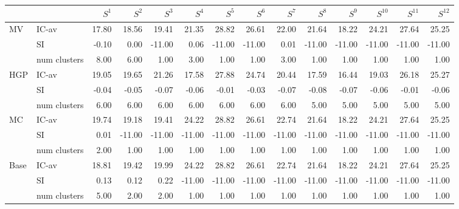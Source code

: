 \begin{tabular}{llrrrrrrrrrrrr}
\toprule
 &  & $S^{1}$ & $S^{2}$ & $S^{3}$ & $S^{4}$ & $S^{5}$ & $S^{6}$ & $S^{7}$ & $S^{8}$ & $S^{9}$ & $S^{10}$ & $S^{11}$ & $S^{12}$ \\
\midrule
\multirow[c]{3}{*}{MV} & IC-av & 17.80 & 18.56 & 19.41 & 21.35 & 28.82 & 26.61 & 22.00 & 21.64 & 18.22 & 24.21 & 27.64 & 25.25 \\
 & SI & -0.10 & 0.00 & -11.00 & 0.06 & -11.00 & -11.00 & 0.01 & -11.00 & -11.00 & -11.00 & -11.00 & -11.00 \\
 & num clusters & 8.00 & 6.00 & 1.00 & 3.00 & 1.00 & 1.00 & 3.00 & 1.00 & 1.00 & 1.00 & 1.00 & 1.00 \\
\multirow[c]{3}{*}{HGP} & IC-av & 19.05 & 19.65 & 21.26 & 17.58 & 27.88 & 24.74 & 20.44 & 17.59 & 16.44 & 19.03 & 26.18 & 25.27 \\
 & SI & -0.04 & -0.05 & -0.07 & -0.06 & -0.01 & -0.03 & -0.07 & -0.08 & -0.07 & -0.06 & -0.01 & -0.06 \\
 & num clusters & 6.00 & 6.00 & 6.00 & 6.00 & 6.00 & 6.00 & 6.00 & 5.00 & 5.00 & 5.00 & 5.00 & 5.00 \\
\multirow[c]{3}{*}{MC} & IC-av & 19.74 & 19.18 & 19.41 & 24.22 & 28.82 & 26.61 & 22.74 & 21.64 & 18.22 & 24.21 & 27.64 & 25.25 \\
 & SI & 0.01 & -11.00 & -11.00 & -11.00 & -11.00 & -11.00 & -11.00 & -11.00 & -11.00 & -11.00 & -11.00 & -11.00 \\
 & num clusters & 2.00 & 1.00 & 1.00 & 1.00 & 1.00 & 1.00 & 1.00 & 1.00 & 1.00 & 1.00 & 1.00 & 1.00 \\
\multirow[c]{3}{*}{Base} & IC-av & 18.81 & 19.42 & 19.99 & 24.22 & 28.82 & 26.61 & 22.74 & 21.64 & 18.22 & 24.21 & 27.64 & 25.25 \\
 & SI & 0.13 & 0.12 & 0.22 & -11.00 & -11.00 & -11.00 & -11.00 & -11.00 & -11.00 & -11.00 & -11.00 & -11.00 \\
 & num clusters & 5.00 & 2.00 & 2.00 & 1.00 & 1.00 & 1.00 & 1.00 & 1.00 & 1.00 & 1.00 & 1.00 & 1.00 \\
\bottomrule
\end{tabular}
